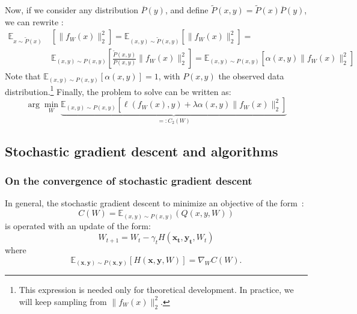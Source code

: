 \documentclass{article}
\begin{document}
Now, if we consider any distribution $\overline{P}(y)$, and  define $\tilde{P}(x,y) = \tilde{P}(x)\overline{P}(y)$, we can rewrite :
\begin{align}
\mathbb{E}_{x\sim \tilde{P}(x)} \ & [\| f_W(x)\|_2^2] = %
\mathbb{E}_{(x,y)\sim \tilde{P}(x,y)} [\| f_W(x)\|_2^2] = \nonumber\\&
\mathbb{E}_{(x,y)\sim P(x,y)}  \left[\frac{\tilde{P}(x,y)}{P(x,y)}\| f_W(x)\|_2^2\right] =
\mathbb{E}_{(x,y)\sim P(x,y)}  [\alpha(x,y)\| f_W(x)\|_2^2]
\label{eqSlice}
\end{align}
Note that $\mathbb{E}_{(x,y)\sim P(x,y)}[\alpha(x,y)] = 1$, with $P(x,y)$ the observed data distribution.\footnote{This expression is needed only for theoretical development. In practice, we will keep sampling from $\| f_W(x)\|_2^2$.}
Finally, the problem to solve can be written as:
\begin{equation}
\arg\min_W \underbrace{\mathbb{E}_{(x,y)\sim P(x,y)} [\ell(f_W(x),y) + \lambda\alpha(x,y)\| f_W(x)\|_2^2]}_{=: C_2(W)} %
\end{equation}

\subsection{Stochastic gradient descent and algorithms}
\subsubsection{On the convergence of stochastic gradient descent}
In general, the stochastic gradient descent to minimize an objective of the form~\cite{bottou1998online}:
\begin{equation}
C(W) = \mathbb{E}_{(x,y) \sim P(x,y)}(Q(x,y,W))
\label{obj}
\end{equation}
is operated with an update of the form:
\begin{equation}
W_{t+1} = W_t - \gamma_t H(\mathbf{x_t,y_t},W_t)
\end{equation}
where
\begin{equation}
\mathbb{E}_{(\mathbf{x,y}) \sim P(\mathbf{x,y})}[H(\mathbf{x,y},W)] = \nabla_WC(W).
\label{eqCondH}
\end{equation}
\end{document}
